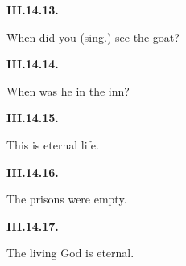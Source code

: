 \par\begin{minipage}{\linewidth}\raggedright
\textbf{III.14.13.}

When did you (sing.) see the goat?

\end{minipage}\par\addvspace{4pt}

\par\begin{minipage}{\linewidth}\raggedright
\textbf{III.14.14.}

When was he in the inn?

\end{minipage}\par\addvspace{4pt}

\par\begin{minipage}{\linewidth}\raggedright
\textbf{III.14.15.}

This is eternal life.

\end{minipage}\par\addvspace{4pt}

\par\begin{minipage}{\linewidth}\raggedright
\textbf{III.14.16.}

The prisons were empty.

\end{minipage}\par\addvspace{4pt}

\par\begin{minipage}{\linewidth}\raggedright
\textbf{III.14.17.}

The living God is eternal.

\end{minipage}\par\addvspace{4pt}

